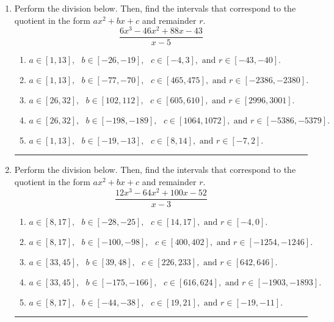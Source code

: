 \documentclass[14pt]{extbook}
\newcommand{\litem}[1]{\item#1\hspace*{-1cm}\rule{\textwidth}{0.4pt}}
\begin{document}
\begin{enumerate}
{\begin{enumerate}[label=\Alph*.]
\end{enumerate} }
\litem{
Perform the division below. Then, find the intervals that correspond to the quotient in the form $ax^2+bx+c$ and remainder $r$.\[ \frac{6x^{3} -46 x^{2} +88 x -43}{x -5} \]\begin{enumerate}[label=\Alph*.]
\item \( a \in [1, 13], \text{   } b \in [-26, -19], \text{   } c \in [-4, 3], \text{   and   } r \in [-43, -40]. \)
\item \( a \in [1, 13], \text{   } b \in [-77, -70], \text{   } c \in [465, 475], \text{   and   } r \in [-2386, -2380]. \)
\item \( a \in [26, 32], \text{   } b \in [102, 112], \text{   } c \in [605, 610], \text{   and   } r \in [2996, 3001]. \)
\item \( a \in [26, 32], \text{   } b \in [-198, -189], \text{   } c \in [1064, 1072], \text{   and   } r \in [-5386, -5379]. \)
\item \( a \in [1, 13], \text{   } b \in [-19, -13], \text{   } c \in [8, 14], \text{   and   } r \in [-7, 2]. \)

\end{enumerate} }
\litem{
Perform the division below. Then, find the intervals that correspond to the quotient in the form $ax^2+bx+c$ and remainder $r$.\[ \frac{12x^{3} -64 x^{2} +100 x -52}{x -3} \]\begin{enumerate}[label=\Alph*.]
\item \( a \in [8, 17], \text{   } b \in [-28, -25], \text{   } c \in [14, 17], \text{   and   } r \in [-4, 0]. \)
\item \( a \in [8, 17], \text{   } b \in [-100, -98], \text{   } c \in [400, 402], \text{   and   } r \in [-1254, -1246]. \)
\item \( a \in [33, 45], \text{   } b \in [39, 48], \text{   } c \in [226, 233], \text{   and   } r \in [642, 646]. \)
\item \( a \in [33, 45], \text{   } b \in [-175, -166], \text{   } c \in [616, 624], \text{   and   } r \in [-1903, -1893]. \)
\item \( a \in [8, 17], \text{   } b \in [-44, -38], \text{   } c \in [19, 21], \text{   and   } r \in [-19, -11]. \)

\end{enumerate} }
\end{enumerate}
\end{document}
